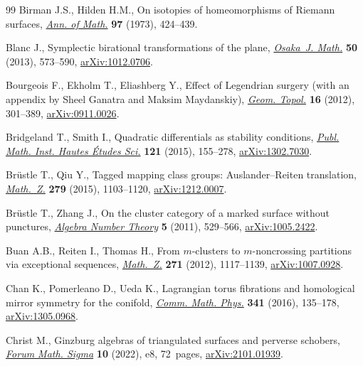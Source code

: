 \begin{thebibliography}{99}
Birman J.S., Hilden H.M., On isotopies of homeomorphisms of {R}iemann surfaces,
 \href{https://doi.org/10.2307/1970830}{\textit{Ann. of Math.}} \textbf{97}
 (1973), 424--439.

Blanc J., Symplectic birational transformations of the plane,
 \href{https://doi.org/10.18910/25084}{\textit{Osaka~J. Math.}} \textbf{50}
 (2013), 573--590, \href{http://arxiv.org/abs/1012.0706}{arXiv:1012.0706}.

Bourgeois F., Ekholm T., Eliashberg Y., Effect of {L}egendrian surgery (with an
 appendix by {S}heel {G}anatra and {M}aksim {M}aydanskiy),
 \href{https://doi.org/10.2140/gt.2012.16.301}{\textit{Geom. Topol.}}
 \textbf{16} (2012), 301--389,
 \href{http://arxiv.org/abs/0911.0026}{arXiv:0911.0026}.

Bridgeland T., Smith I., Quadratic differentials as stability conditions,
 \href{https://doi.org/10.1007/s10240-014-0066-5}{\textit{Publ. Math. Inst.
 Hautes \'{E}tudes Sci.}} \textbf{121} (2015), 155--278,
 \href{http://arxiv.org/abs/1302.7030}{arXiv:1302.7030}.

Br\"{u}stle T., Qiu Y., Tagged mapping class groups: {A}uslander--{R}eiten
 translation,
 \href{https://doi.org/10.1007/s00209-015-1405-z}{\textit{Math.~Z.}}
 \textbf{279} (2015), 1103--1120,
 \href{http://arxiv.org/abs/1212.0007}{arXiv:1212.0007}.

Br\"{u}stle T., Zhang J., On the cluster category of a marked surface without
 punctures, \href{https://doi.org/10.2140/ant.2011.5.529}{\textit{Algebra
 Number Theory}} \textbf{5} (2011), 529--566,
 \href{http://arxiv.org/abs/1005.2422}{arXiv:1005.2422}.

Buan A.B., Reiten I., Thomas H., From {$m$}-clusters to {$m$}-noncrossing
 partitions via exceptional sequences,
 \href{https://doi.org/10.1007/s00209-011-0906-7}{\textit{Math.~Z.}}
 \textbf{271} (2012), 1117--1139,
 \href{http://arxiv.org/abs/1007.0928}{arXiv:1007.0928}.

Chan K., Pomerleano D., Ueda K., Lagrangian torus fibrations and homological
 mirror symmetry for the conifold,
 \href{https://doi.org/10.1007/s00220-015-2477-7}{\textit{Comm. Math. Phys.}}
 \textbf{341} (2016), 135--178,
 \href{http://arxiv.org/abs/1305.0968}{arXiv:1305.0968}.

Christ M., Ginzburg algebras of triangulated surfaces and perverse schobers,
 \href{https://doi.org/10.1017/fms.2022.1}{\textit{Forum Math. Sigma}}
 \textbf{10} (2022), e8, 72~pages,
 \href{http://arxiv.org/abs/2101.01939}{arXiv:2101.01939}.


\end{thebibliography}
